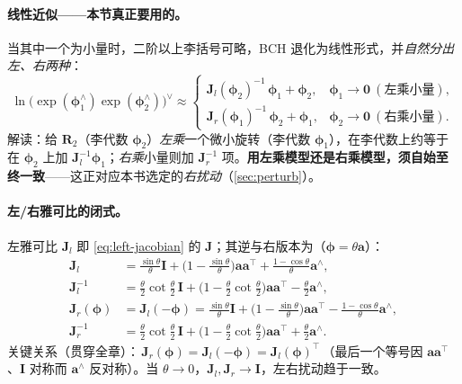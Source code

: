 \paragraph{线性近似——本节真正要用的。}
当其中一个为小量时，二阶以上李括号可略，BCH 退化为线性形式，并\emph{自然分出左、右两种}\cite{gaoxiang2019slam14}：
\begin{equation}
  \ln\!\big(\exp(\boldsymbol{\phi}_1^\wedge)\exp(\boldsymbol{\phi}_2^\wedge)\big)^\vee\approx
  \begin{cases}
    \mathbf{J}_l(\boldsymbol{\phi}_2)^{-1}\,\boldsymbol{\phi}_1+\boldsymbol{\phi}_2, & \boldsymbol{\phi}_1\to\mathbf{0}\ (\text{左乘小量}),\\[2pt]
    \mathbf{J}_r(\boldsymbol{\phi}_1)^{-1}\,\boldsymbol{\phi}_2+\boldsymbol{\phi}_1, & \boldsymbol{\phi}_2\to\mathbf{0}\ (\text{右乘小量}).
  \end{cases}
  \label{eq:bch-linear}
\end{equation}
解读：给 $\mathbf{R}_2$（李代数 $\boldsymbol{\phi}_2$）\emph{左乘}一个微小旋转（李代数 $\boldsymbol{\phi}_1$），在李代数上约等于在 $\boldsymbol{\phi}_2$ 上加 $\mathbf{J}_l^{-1}\boldsymbol{\phi}_1$；\emph{右乘}小量则加 $\mathbf{J}_r^{-1}$ 项。\textbf{用左乘模型还是右乘模型，须自始至终一致}——这正对应本书选定的\emph{右扰动}（\cref{sec:perturb}）。

\paragraph{左/右雅可比的闭式。}左雅可比 $\mathbf{J}_l$ 即 \cref{eq:left-jacobian} 的 $\mathbf{J}$；其逆与右版本为（$\boldsymbol{\phi}=\theta\mathbf{a}$）：
\begin{align}
  \mathbf{J}_l &= \frac{\sin\theta}{\theta}\mathbf{I}+\Big(1-\frac{\sin\theta}{\theta}\Big)\mathbf{a}\mathbf{a}^\top+\frac{1-\cos\theta}{\theta}\mathbf{a}^\wedge,\label{eq:Jl}\\
  \mathbf{J}_l^{-1} &= \frac{\theta}{2}\cot\frac{\theta}{2}\,\mathbf{I}+\Big(1-\frac{\theta}{2}\cot\frac{\theta}{2}\Big)\mathbf{a}\mathbf{a}^\top-\frac{\theta}{2}\mathbf{a}^\wedge,\\
  \mathbf{J}_r(\boldsymbol{\phi}) &= \mathbf{J}_l(-\boldsymbol{\phi})=\frac{\sin\theta}{\theta}\mathbf{I}+\Big(1-\frac{\sin\theta}{\theta}\Big)\mathbf{a}\mathbf{a}^\top-\frac{1-\cos\theta}{\theta}\mathbf{a}^\wedge,\label{eq:Jr}\\
  \mathbf{J}_r^{-1} &= \frac{\theta}{2}\cot\frac{\theta}{2}\,\mathbf{I}+\Big(1-\frac{\theta}{2}\cot\frac{\theta}{2}\Big)\mathbf{a}\mathbf{a}^\top+\frac{\theta}{2}\mathbf{a}^\wedge.
\end{align}
关键关系（贯穿全章）：$\boxed{\,\mathbf{J}_r(\boldsymbol{\phi})=\mathbf{J}_l(-\boldsymbol{\phi})=\mathbf{J}_l(\boldsymbol{\phi})^\top\,}$（最后一个等号因 $\mathbf{a}\mathbf{a}^\top$、$\mathbf{I}$ 对称而 $\mathbf{a}^\wedge$ 反对称）。当 $\theta\to0$，$\mathbf{J}_l,\mathbf{J}_r\to\mathbf{I}$，左右扰动趋于一致。

